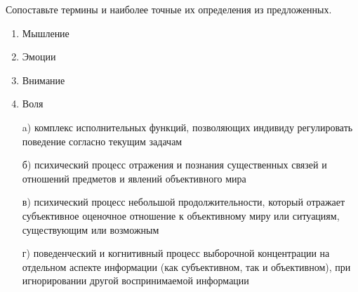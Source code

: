 
Сопоставьте термины и наиболее точные их определения из предложенных.

\begin{enumerate}
    \item Мышление
    \item Эмоции
    \item Внимание
    \item Воля
\end{enumerate}

\begin{enumerate}
    \item[a)] комплекс исполнительных функций, позволяющих индивиду регулировать поведение согласно текущим задачам
    \item[б)] психический процесс отражения и познания существенных связей и отношений предметов и явлений объективного мира
    \item[в)] психический процесс небольшой продолжительности, который отражает субъективное оценочное отношение к объективному миру или ситуациям, существующим или возможным
    \item[г)] поведенческий и когнитивный процесс выборочной концентрации на отдельном аспекте информации (как субъективном, так и объективном), при игнорировании другой воспринимаемой информации   
\end{enumerate}

